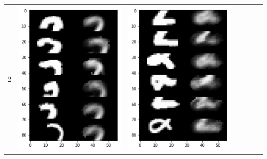 \documentclass[12pt]{report} %
\begin{document}
\begin{tabular}{m{0.7cm}m{2.4cm}m{2.4cm}m{2.4cm}m{2.4cm}m{2.4cm}m{2.4cm}}
	2 & \includegraphics[scale=0.3]{pictures/KE_2_up.png} & \includegraphics[scale=0.3]{pictures/KE_2_down.png} &

\end{tabular}
\end{document}
